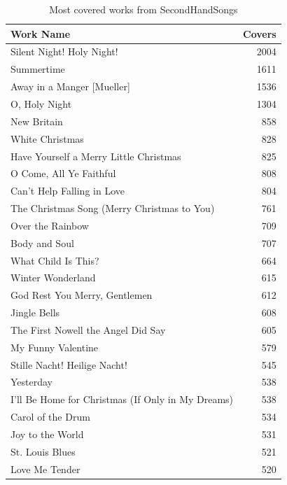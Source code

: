 \begin{table}[H]
\centering
\caption{Most covered works from SecondHandSongs}
\label{my-label}
\begin{tabular}{lr}
\hline
 Work Name                                         &   Covers \\
\hline
 Silent Night! Holy Night!                         &     2004 \\
 Summertime                                        &     1611 \\
 Away in a Manger [Mueller]                        &     1536 \\
 O, Holy Night                                     &     1304 \\
 New Britain                                       &      858 \\
 White Christmas                                   &      828 \\
 Have Yourself a Merry Little Christmas            &      825 \\
 O Come, All Ye Faithful                           &      808 \\
 Can't Help Falling in Love                        &      804 \\
 The Christmas Song (Merry Christmas to You)       &      761 \\
 Over the Rainbow                                  &      709 \\
 Body and Soul                                     &      707 \\
 What Child Is This?                               &      664 \\
 Winter Wonderland                                 &      615 \\
 God Rest You Merry, Gentlemen                     &      612 \\
 Jingle Bells                                      &      608 \\
 The First Nowell the Angel Did Say                &      605 \\
 My Funny Valentine                                &      579 \\
 Stille Nacht! Heilige Nacht!                      &      545 \\
 Yesterday                                         &      538 \\
 I'll Be Home for Christmas (If Only in My Dreams) &      538 \\
 Carol of the Drum                                 &      534 \\
 Joy to the World                                  &      531 \\
 St. Louis Blues                                   &      521 \\
 Love Me Tender                                    &      520 \\
\hline
\end{tabular}
\end{table}

